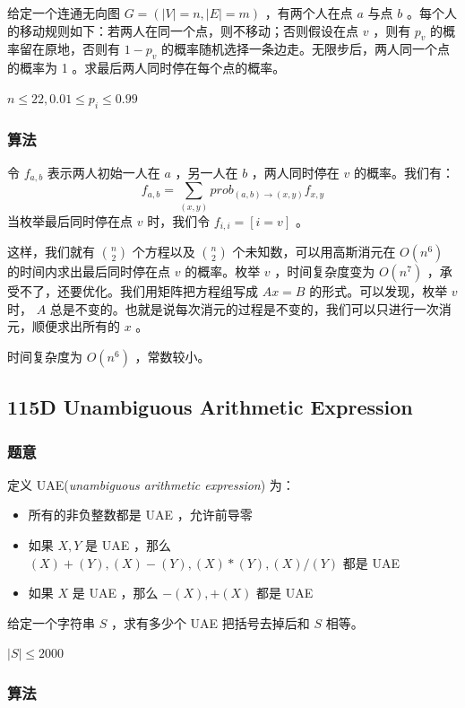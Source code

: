 \documentclass[11pt]{article}
\begin{document}
    给定一个连通无向图 $G = (|V| = n, |E| = m)$ ，有两个人在点 $a$ 与点 $b$ 。每个人的移动规则如下：若两人在同一个点，则不移动；否则假设在点 $v$ ，则有 $p_v$ 的概率留在原地，否则有 $1 - p_v$ 的概率随机选择一条边走。无限步后，两人同一个点的概率为 1 。求最后两人同时停在每个点的概率。

    $n \leq 22, 0.01 \leq p_i \leq 0.99$
\subsubsection{算法}
\label{sec-8-3-2}

    令 $f_{a, b}$ 表示两人初始一人在 $a$ ，另一人在 $b$ ，两人同时停在 $v$ 的概率。我们有：
    $$f_{a, b} = \sum_{(x, y)} prob_{(a, b) \to (x, y)} f_{x, y}$$
    当枚举最后同时停在点 $v$ 时，我们令 $f_{i,i} = [i = v]$ 。

    这样，我们就有 ${n \choose 2}$ 个方程以及 ${n \choose 2}$ 个未知数，可以用高斯消元在 $O(n^6)$ 的时间内求出最后同时停在点 $v$ 的概率。枚举 $v$ ，时间复杂度变为 $O(n^7)$ ，承受不了，还要优化。我们用矩阵把方程组写成 $Ax = B$ 的形式。可以发现，枚举 $v$ 时， $A$ 总是不变的。也就是说每次消元的过程是不变的，我们可以只进行一次消元，顺便求出所有的 $x$ 。

    时间复杂度为 $O(n^6)$ ，常数较小。
\subsection{115D  Unambiguous Arithmetic Expression}
\label{sec-8-4}
\subsubsection{题意}
\label{sec-8-4-1}

\begin{definition}
  定义 UAE(\textit{unambiguous arithmetic expression}) 为：
  \begin{itemize}
  \item 所有的非负整数都是 UAE ，允许前导零
  \item 如果 $X, Y$ 是 UAE ，那么 $(X)+(Y), (X)-(Y), (X)*(Y), (X)/(Y)$ 都是 UAE
  \item 如果 $X$ 是 UAE ，那么 $-(X), +(X)$ 都是 UAE
  \end{itemize}
\end{definition}

    给定一个字符串 $S$ ，求有多少个 UAE 把括号去掉后和 $S$ 相等。

    $|S| \leq 2000$
\subsubsection{算法}
\label{sec-8-4-2}
\end{document}
